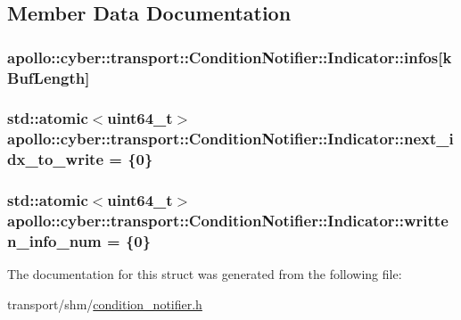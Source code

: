\subsection{Member Data Documentation}
\hypertarget{structapollo_1_1cyber_1_1transport_1_1ConditionNotifier_1_1Indicator_aa5c93bf8b4d22a52019d524ef1991455}{
\subsubsection[{infos}]{ apollo\-::cyber\-::transport\-::\-Condition\-Notifier\-::\-Indicator\-::infos\mbox{[}{\bf k\-Buf\-Length}\mbox{]}}}\label{structapollo_1_1cyber_1_1transport_1_1ConditionNotifier_1_1Indicator_aa5c93bf8b4d22a52019d524ef1991455}
\hypertarget{structapollo_1_1cyber_1_1transport_1_1ConditionNotifier_1_1Indicator_a1982f4b9b860d3141523143518567049}{
\subsubsection[{next\-\_\-idx\-\_\-to\-\_\-write}]{\setlength{\rightskip}{0pt plus 5cm}std\-::atomic$<$uint64\-\_\-t$>$ apollo\-::cyber\-::transport\-::\-Condition\-Notifier\-::\-Indicator\-::next\-\_\-idx\-\_\-to\-\_\-write = \{0\}}}\label{structapollo_1_1cyber_1_1transport_1_1ConditionNotifier_1_1Indicator_a1982f4b9b860d3141523143518567049}
\hypertarget{structapollo_1_1cyber_1_1transport_1_1ConditionNotifier_1_1Indicator_a10e7c84d2e0c307c9c72f5160f83d8ec}{
\subsubsection[{written\-\_\-info\-\_\-num}]{\setlength{\rightskip}{0pt plus 5cm}std\-::atomic$<$uint64\-\_\-t$>$ apollo\-::cyber\-::transport\-::\-Condition\-Notifier\-::\-Indicator\-::written\-\_\-info\-\_\-num = \{0\}}}\label{structapollo_1_1cyber_1_1transport_1_1ConditionNotifier_1_1Indicator_a10e7c84d2e0c307c9c72f5160f83d8ec}


The documentation for this struct was generated from the following file\-:\begin{DoxyCompactItemize}
\item 
transport/shm/\hyperlink{condition__notifier_8h}{condition\-\_\-notifier.\-h}\end{DoxyCompactItemize}
